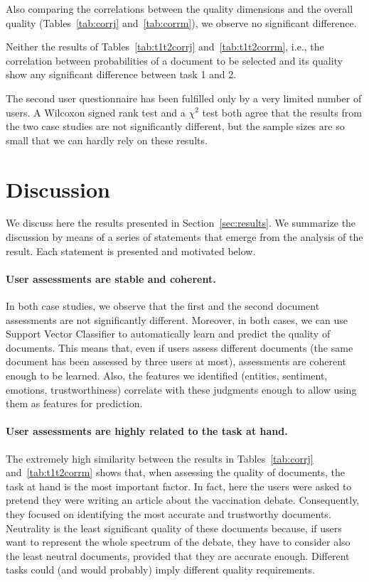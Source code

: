 \documentclass{llncs}
\begin{document}
Also comparing the correlations between the quality dimensions and the overall quality (Tables~\ref{tab:corrj} and~\ref{tab:corrm}), we observe no significant difference.

Neither the results of Tables~\ref{tab:t1t2corrj} and~\ref{tab:t1t2corrm}, i.e., the correlation between probabilities of a document to be selected and its quality show any significant difference between task 1 and 2.

The second user questionnaire has been fulfilled only by a very limited number of users. A Wilcoxon signed rank test and a $\chi^2$ test both agree that the results from the two case studies are not significantly different, but the sample sizes are so small that we can hardly rely on these results.
\section{Discussion}
\label{sec:discussion}
We discuss here the results presented in Section~\ref{sec:results}.
We summarize the discussion by means of a series of statements that emerge from the analysis of the result. Each statement is presented and motivated below.
\paragraph{{\bf User assessments are stable and coherent.}} In both case studies, we observe that the first and the second document assessments are not significantly different. Moreover, in both cases, we can use Support Vector Classifier to automatically learn and predict the quality of documents. This means that, even if users assess different documents (the same document has been assessed by three users at most), assessments are coherent enough to be learned. Also, the features we identified (entities, sentiment, emotions, trustworthiness) correlate with these judgments enough to allow using them as features for prediction. 
\paragraph{{\bf User assessments are highly related to the task at hand.}}
The extremely high similarity between the results in Tables~\ref{tab:corrj} and~\ref{tab:t1t2corrm} shows that, when assessing the quality of documents, the task at hand is the most important factor. In fact, here the users were asked to pretend they were writing an article about the vaccination debate. Consequently, they focused on identifying the most accurate and trustworthy documents. Neutrality is the least significant quality of these documents because, if users want to represent the whole spectrum of the debate, they have to consider also the least neutral documents, provided that they are accurate enough. Different tasks could (and would probably) imply different quality requirements.
\end{document}
